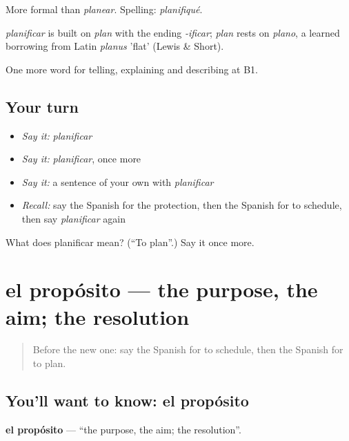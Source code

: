 More formal than \emph{planear}. Spelling: \emph{planifiqué}.

\begin{cousinweb}
\emph{planificar} is built on \emph{plan} with the ending \emph{-ificar}; \emph{plan} rests on \emph{plano}, a learned borrowing from Latin \emph{planus} 'flat' (Lewis \& Short).
\end{cousinweb}

\begin{grammarlens}[title={What you've built}]
One more word for telling, explaining and describing at B1.
\end{grammarlens}

\subsection*{Your turn}
\begin{itemize}
\raggedright
  \item \emph{Say it:} \emph{planificar}
  \item \emph{Say it:} \emph{planificar}, once more
  \item \emph{Say it:} a sentence of your own with \emph{planificar}
  \item \emph{Recall:} say the Spanish for the protection, then the Spanish for to schedule, then say \emph{planificar} again
\end{itemize}

\begin{tcolorbox}[breakable,colback=teal!4,colframe=teal!35!black,title={Before you move on}]
What does planificar mean? (\textquotedblleft{}To plan\textquotedblright{}.) Say it once more.
\end{tcolorbox}
\section[el propósito]{el propósito — the purpose, the aim; the resolution}

\label{lesson:ES-C615-proposito}



\begin{quote}
Before the new one: say the Spanish for to schedule, then the Spanish for to plan.
\end{quote}

\subsection*{You'll want to know: el propósito}
\textbf{el propósito} — \textquotedblleft{}the purpose, the aim; the resolution\textquotedblright{}.

